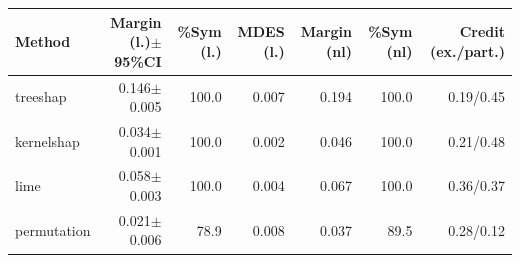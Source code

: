 \begin{tabular}{@{}lrrrrrr@{}}
\toprule
Method & Margin (l.)$\pm$95\%CI & \%Sym (l.) & MDES (l.) & Margin (nl) & \%Sym (nl) & Credit (ex./part.) \\
\midrule
treeshap & 0.146$\pm$0.005 & 100.0 & 0.007 & 0.194 & 100.0 & 0.19/0.45 \\
kernelshap & 0.034$\pm$0.001 & 100.0 & 0.002 & 0.046 & 100.0 & 0.21/0.48 \\
lime & 0.058$\pm$0.003 & 100.0 & 0.004 & 0.067 & 100.0 & 0.36/0.37 \\
permutation & 0.021$\pm$0.006 & 78.9 & 0.008 & 0.037 & 89.5 & 0.28/0.12 \\
\bottomrule
\end{tabular}
